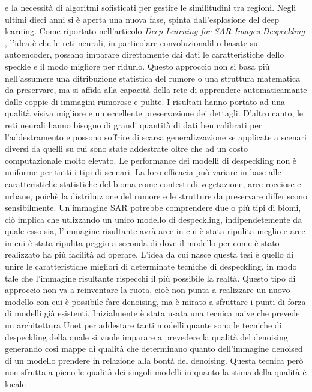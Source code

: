 e la necessità di algoritmi sofisticati per gestire le similitudini tra regioni. Negli ultimi dieci 
anni si è aperta una nuova fase, spinta dall'esplosione del deep learning. Come riportato nell'articolo 
\textit{Deep Learning for SAR Images Despeckling} \cite{DL_SAR}, l'idea è che le reti neurali, in 
particolare convoluzionalil o basate su autoencoder, possano imparare direttamente dai dati le caratteristiche
dello speckle e il modo migliore per ridurlo. Questo approccio non si basa più nell'assumere una ditribuzione 
statistica del rumore o una struttura matematica da preservare, ma si affida alla capacità della rete di 
apprendere automaticamante dalle coppie di immagini rumorose e pulite. I risultati hanno portato ad una qualità 
visiva migliore e un eccellente preservazione dei dettagli. D'altro canto, le reti neurali hanno bisogno 
di grandi quantità di dati ben calibrati per l'addestramento e possono soffrire di scarsa generalizzazione se 
applicate a scenari diversi da quelli su cui sono state addestrate oltre che ad un costo computazionale molto elevato. 
Le performance dei modelli di despeckling non è uniforme per tutti i tipi di scenari. La loro efficacia può variare
in base alle caratteristiche statistiche del bioma come contesti di vegetazione, aree rocciose e urbane, 
poichè la distribuzione del rumore e le strutture da preservare differiscono sensibilmente. Un'immagine SAR potrebbe 
comprendere due o più tipi di biomi, ciò implica che utlizzando un unico modello di despeckling, 
indipendetemente da quale esso sia, l'immagine risultante avrà aree in cui è stata ripulita meglio e aree in cui è 
stata ripulita peggio a seconda di dove il modello per come è stato realizzato ha più facilità ad operare.
L'idea da cui nasce questa tesi è quello di unire le caratteristiche migliori di determinate tecniche di despeckling, 
in modo tale che l'immagine risultante rispecchi il più possibile la realtà. Questo tipo di approccio non va a 
reinventare la ruota, cioè non punta a realizzare un nuovo modello con cui è possibile fare denoising, ma è mirato
a sfruttare i punti di forza di modelli già esistenti. Inizialmente è stata usata una tecnica naive che 
prevede un architettura Unet per addestare tanti modelli quante sono le tecniche di despeckling 
della quale si vuole imparare a prevedere la qualità del denoising generando così mappe di qualità 
che determinano quanto dell'immagine denoised di un  modello prendere in relazione alla bontà del denoising.
Questa tecnica però non sfrutta a pieno le qualità dei singoli modelli in quanto la stima della qualità è locale 
